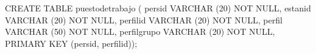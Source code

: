 \lstset{caption=Crear tabla ``puestosdetrabajo'',label=sql:crearTablaPuestosdetrabajo}
\begin{SQL}
CREATE TABLE puestodetrabajo (
persid VARCHAR (20) NOT NULL,
estanid VARCHAR (20) NOT NULL,
perfilid VARCHAR (20) NOT NULL,
perfil VARCHAR (50) NOT NULL,
perfilgrupo VARCHAR (20) NOT NULL,
PRIMARY KEY (persid, perfilid));
\end{SQL}

